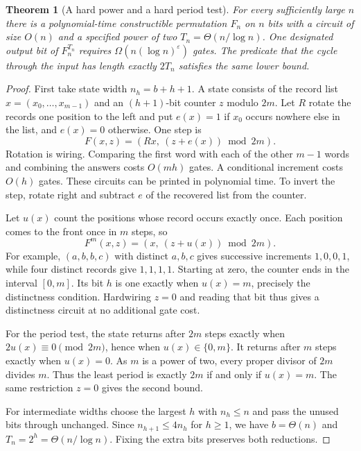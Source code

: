 \documentclass[11pt]{article}
\newtheorem{theorem}{Theorem}[section]
\theoremstyle{definition}
\theoremstyle{remark}
\numberwithin{equation}{section}
\begin{document}
\begin{theorem}[A hard power and a hard period test]
\label{thm:distinctness-power}
For every sufficiently large $n$ there is a polynomial-time constructible
permutation $F_n$ on $n$ bits with a circuit of size $O(n)$ and a specified
power of two $T_n=\Theta(n/\log n)$. One designated output bit of
$F_n^{T_n}$ requires $\Omega(n(\log n)^\varepsilon)$ gates. The predicate
that the cycle through the input has length exactly $2T_n$ satisfies the
same lower bound.
\end{theorem}

\begin{proof}
First take state width $n_h=b+h+1$. A state consists of the record list
$x=(x_0,\ldots,x_{m-1})$ and an $(h+1)$-bit counter $z$ modulo $2m$.
Let $R$ rotate the records one position to the left and put
$e(x)=1$ if $x_0$ occurs nowhere else in the list, and $e(x)=0$ otherwise.
One step is
\[
  F(x,z)=(Rx,\ (z+e(x))\bmod 2m).
\]
Rotation is wiring. Comparing the first word with each of the other $m-1$
words and combining the answers costs $O(mh)$ gates. A conditional
increment costs $O(h)$ gates. These circuits can be printed in polynomial
time. To invert the step, rotate right and subtract $e$ of the recovered
list from the counter.

Let $u(x)$ count the positions whose record occurs exactly once.
Each position comes to the front once in $m$ steps, so
\begin{equation}\label{eq:distinctness-lap}
 F^m(x,z)=(x,\ (z+u(x))\bmod 2m).
\end{equation}
For example, $(a,b,b,c)$ with distinct $a,b,c$ gives successive increments
$1,0,0,1$, while four distinct records give $1,1,1,1$. Starting at zero,
the counter ends in the interval $[0,m]$. Its bit $h$ is one exactly when
$u(x)=m$, precisely the distinctness condition. Hardwiring $z=0$ and
reading that bit thus gives a distinctness circuit at no additional gate
cost.

For the period test, the state returns after $2m$ steps exactly when
$2u(x)\equiv0\pmod{2m}$, hence when $u(x)\in\{0,m\}$. It returns after $m$
steps exactly when $u(x)=0$. As $m$ is a power of two, every proper
divisor of $2m$ divides $m$. Thus the least period is exactly $2m$ if
and only if $u(x)=m$. The same restriction $z=0$ gives the second bound.

For intermediate widths choose the largest $h$ with $n_h\le n$ and pass
the unused bits through unchanged. Since $n_{h+1}\le4n_h$ for $h\ge1$,
we have $b=\Theta(n)$ and $T_n=2^h=\Theta(n/\log n)$. Fixing the extra
bits preserves both reductions.
\end{proof}
\end{document}
